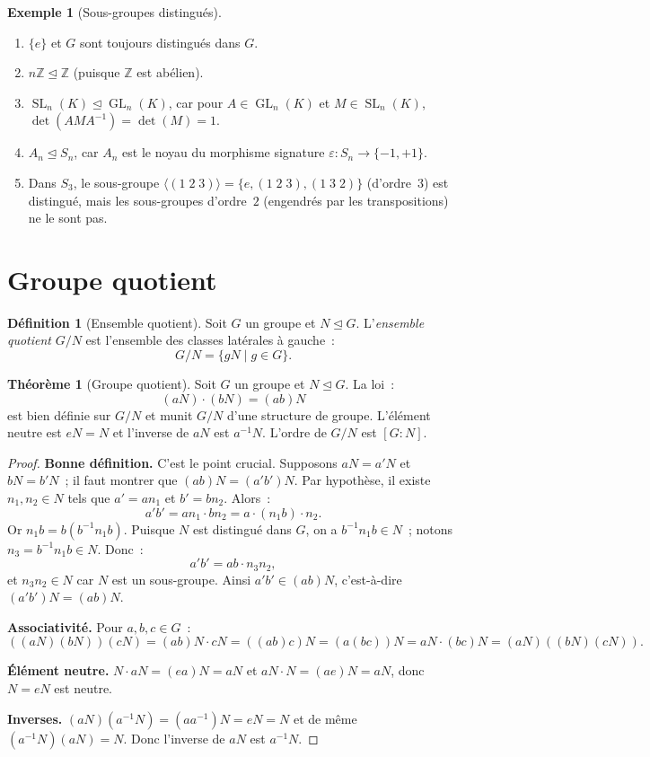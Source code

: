 \documentclass[12pt,a4paper,openany]{book}
\theoremstyle{definition}
\newtheorem{definition}{Définition}[chapter]
\newtheorem{theoreme}{Théorème}[chapter]
\newtheorem{exemple}{Exemple}[chapter]
\newcommand{\Z}{\mathbb{Z}}
\DeclareMathOperator{\GL}{GL}
\DeclareMathOperator{\SL}{SL}
\newcommand{\normal}{\trianglelefteq}
\newcommand{\gen}[1]{\langle #1 \rangle}
\newcommand{\idx}[2]{[#1:#2]}
\begin{document}
\begin{exemple}[Sous-groupes distingués]
\label{ex:sg-distingues}
\begin{enumerate}[label=(\roman*)]
  \item $\{e\}$ et $G$ sont toujours distingués dans $G$.
  \item $n\Z \normal \Z$ (puisque $\Z$ est abélien).
  \item $\SL_n(K) \normal \GL_n(K)$, car pour $A \in \GL_n(K)$ et $M \in \SL_n(K)$,
    $\det(AMA^{-1}) = \det(M) = 1$.
  \item $A_n \normal S_n$, car $A_n$ est le noyau du morphisme signature $\varepsilon :
    S_n \to \{-1, +1\}$.
  \item Dans $S_3$, le sous-groupe $\gen{(1\;2\;3)} = \{e, (1\;2\;3), (1\;3\;2)\}$
    (d'ordre~$3$) est distingué, mais les sous-groupes d'ordre~$2$ (engendrés par les
    transpositions) ne le sont pas.
\end{enumerate}
\end{exemple}

\section{Groupe quotient}
\label{sec:ch2-quotient}

\begin{definition}[Ensemble quotient]
\label{def:ensemble-quotient}
Soit $G$ un groupe et $N \normal G$. L'\emph{ensemble quotient} $G/N$ est l'ensemble des
classes latérales à gauche~:
\[
  G/N = \{ gN \mid g \in G \}.
\]
\end{definition}

\begin{theoreme}[Groupe quotient]
\label{thm:groupe-quotient}
Soit $G$ un groupe et $N \normal G$. La loi~:
\[
  (aN) \cdot (bN) = (ab)N
\]
est bien définie sur $G/N$ et munit $G/N$ d'une structure de groupe. L'élément neutre
est $eN = N$ et l'inverse de $aN$ est $a^{-1}N$. L'ordre de $G/N$ est $\idx{G}{N}$.
\end{theoreme}

\begin{proof}
\textbf{Bonne définition.} C'est le point crucial. Supposons $aN = a'N$ et $bN = b'N$~;
il faut montrer que $(ab)N = (a'b')N$. Par hypothèse, il existe $n_1, n_2 \in N$ tels
que $a' = an_1$ et $b' = bn_2$. Alors~:
\[
  a'b' = an_1 \cdot bn_2 = a \cdot (n_1 b) \cdot n_2.
\]
Or $n_1 b = b(b^{-1}n_1 b)$. Puisque $N$ est distingué dans $G$, on a $b^{-1}n_1 b \in
N$~; notons $n_3 = b^{-1}n_1 b \in N$. Donc~:
\[
  a'b' = ab \cdot n_3 n_2,
\]
et $n_3 n_2 \in N$ car $N$ est un sous-groupe. Ainsi $a'b' \in (ab)N$, c'est-à-dire
$(a'b')N = (ab)N$.

\textbf{Associativité.} Pour $a, b, c \in G$~:
\[
  ((aN)(bN))(cN) = (ab)N \cdot cN = ((ab)c)N = (a(bc))N = aN \cdot (bc)N = (aN)((bN)(cN)).
\]

\textbf{Élément neutre.} $N \cdot aN = (ea)N = aN$ et $aN \cdot N = (ae)N = aN$, donc
$N = eN$ est neutre.

\textbf{Inverses.} $(aN)(a^{-1}N) = (aa^{-1})N = eN = N$ et de même
$(a^{-1}N)(aN) = N$. Donc l'inverse de $aN$ est $a^{-1}N$.
\end{proof}
\end{document}
